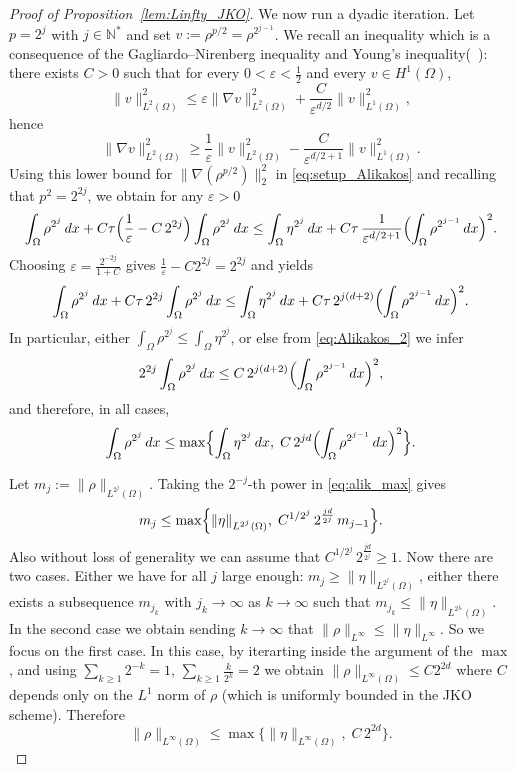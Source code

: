 \documentclass[a4paper,twosided, 11pt]{article}
\theoremstyle{plain}
\theoremstyle{remark}
\numberwithin{equation}{section}
\begin{document}
{\begin{proof}[Proof of Proposition~\ref{lem:Linfty_JKO}]
We now run a dyadic iteration. Let $p=2^j$ with $j\in\mathbb N^\ast$ and set
$v:=\rho^{p/2}=\rho^{2^{j-1}}$.
We recall an inequality which is a consequence of the Gagliardo--Nirenberg inequality and Young's inequality(~\cite{MR1778284}): there exists $C>0$ such that for every
$0<\varepsilon<\frac12$ and every $v\in H^1(\Omega)$,
\[
\|v\|_{L^{2}(\Omega)}^2\le \varepsilon \|\nabla v\|_{L^{2}(\Omega)}^2
+ \frac{C}{\varepsilon^{d/2}}\|v\|_{L^{1}(\Omega)}^2,
\]
hence
\[
\|\nabla v\|_{L^2(\Omega)}^2
\ge \frac{1}{\varepsilon}\|v\|_{L^2(\Omega)}^2
- \frac{C}{\varepsilon^{d/2+1}}\|v\|_{L^1(\Omega)}^2.
\]
Using this lower bound for $\|\nabla(\rho^{p/2})\|_2^2$ in \eqref{eq:setup_Alikakos} and recalling
that $p^2=2^{2j}$, we obtain for any $\varepsilon>0$
\[
\int_\Omega \rho^{2^j}\,dx
+ C\tau\Bigl(\frac{1}{\varepsilon}-C\,2^{2j}\Bigr)\int_\Omega \rho^{2^j}\,dx
\le
\int_\Omega \eta^{2^j}\,dx
+ C\tau\,\frac{1}{\varepsilon^{d/2+1}}
\Bigl(\int_\Omega \rho^{2^{j-1}}\,dx\Bigr)^2.
\]
Choosing $\varepsilon=\frac{2^{-2j}}{1+C}$ gives $\frac{1}{\varepsilon}-C2^{2j}=2^{2j}$ and yields
\begin{equation}\label{eq:Alikakos_2}
\int_\Omega \rho^{2^j}\,dx
+ C\tau\,2^{2j}\int_\Omega \rho^{2^j}\,dx
\le
\int_\Omega \eta^{2^j}\,dx
+ C\tau\,2^{j(d+2)}
\Bigl(\int_\Omega \rho^{2^{j-1}}\,dx\Bigr)^2.
\end{equation}
In particular, either $\int_\Omega \rho^{2^j}\le \int_\Omega \eta^{2^j}$, or else from
\eqref{eq:Alikakos_2} we infer
\[
2^{2j}\int_\Omega \rho^{2^j}\,dx
\le
C\,2^{j(d+2)}\Bigl(\int_\Omega \rho^{2^{j-1}}\,dx\Bigr)^2,
\]
and therefore, in all cases,
\begin{equation}\label{eq:alik_max}
\int_\Omega \rho^{2^j}\,dx
\le
\max\Bigl\{
\int_\Omega \eta^{2^j}\,dx,\;
C\,2^{jd}\Bigl(\int_\Omega \rho^{2^{j-1}}\,dx\Bigr)^2
\Bigr\}.
\end{equation}

Let $m_j:=\|\rho\|_{L^{2^j}(\Omega)}$.
Taking the $2^{-j}$-th power in \eqref{eq:alik_max} gives
\[
m_j
\le
\max\Bigl\{
\|\eta\|_{L^{2^j}(\Omega)},\;
C^{1/2^j}\,2^{\frac{jd}{2^j}}\,m_{j-1}
\Bigr\}.
\]
Also without loss of generality we can assume that $C^{1/2^j}\,2^{\frac{jd}{2^j}}\ge 1$. Now there are two cases. Either we have for all $j$ large enough: $m_j\ge \|\eta\|_{L^{2^j}(\Omega)}$, either there exists a subsequence $m_{j_k}$ with $j_k\to \infty$ as $k\to\infty$ such that $m_{j_k}\le \|\eta\|_{L^{2^{j_k}}(\Omega)} $. In the second case we obtain sending $k\to \infty$ that $\|\rho\|_{L^{\infty}}\le \|\eta\|_{L^{\infty}}$. So we focus on the first case. In this case, by iterarting inside the argument of the $\max$, and using $\sum_{k\ge 1}2^{-k}=1$, $\sum_{k\ge 1}\frac{k}{2^k}=2$ we obtain $\|\rho\|_{L^\infty(\Omega)}\le C2^{2d}$ where $C$ depends only on the $L^1$ norm of $\rho$ (which is uniformly bounded in the JKO scheme). Therefore 
\[
\|\rho\|_{L^\infty(\Omega)}
\le 
\max\bigl\{\|\eta\|_{L^\infty(\Omega)},\; C\,2^{2d}\bigr\}.
\]


\end{proof}}
\end{document}
